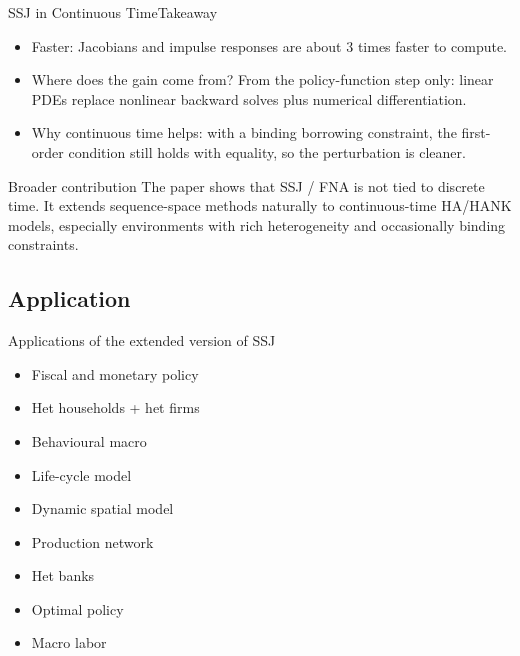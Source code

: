 \documentclass[aspectratio=169]{beamer}
\begin{document}
\begin{frame}{SSJ in Continuous Time}{Takeaway \cite{bilal2025some}}
\small

\begin{itemize}
    \item \alert{Faster}: Jacobians and impulse responses are about \alert{3 times faster} to compute.
    \item \alert{Where does the gain come from?}  
    From the policy-function step only:
    linear PDEs replace nonlinear backward solves plus numerical differentiation.
    \item \alert{Why continuous time helps}: with a binding borrowing constraint,
    the first-order condition still holds with equality, so the perturbation is cleaner.
\end{itemize}

\begin{alertblock}{Broader contribution}
The paper shows that SSJ / FNA is not tied to discrete time.  
It extends sequence-space methods naturally to \alert{continuous-time HA/HANK models},
especially environments with rich heterogeneity and occasionally binding constraints.
\end{alertblock}

\end{frame}


\subsection{Application}

\begin{frame}{Applications of the extended version of SSJ}
    \begin{itemize}
        \item Fiscal and monetary policy \cite{auclert2025fiscal,auclert2024intertemporal}
        \item Het households + het firms \cite{winberry2025new}
        \item Behavioural macro \cite{angeletos2025rank,auclert2020micro}
        \item Life-cycle model \cite{bardoczy2025sequence,bardoczy2024hank}
        \item Dynamic spatial model \cite{donald2025optimal,fan2023learning}
        \item Production network \cite{schaab2023monetary}
        \item Het banks \cite{bellifemine2022hbank}
        \item Optimal policy \cite{auclert2024optimal,mckay2022optimal}
        \item Macro labor \cite{guerreiro2024workers,kekre2023unemployment}
    \end{itemize}
\end{frame}
\end{document}
